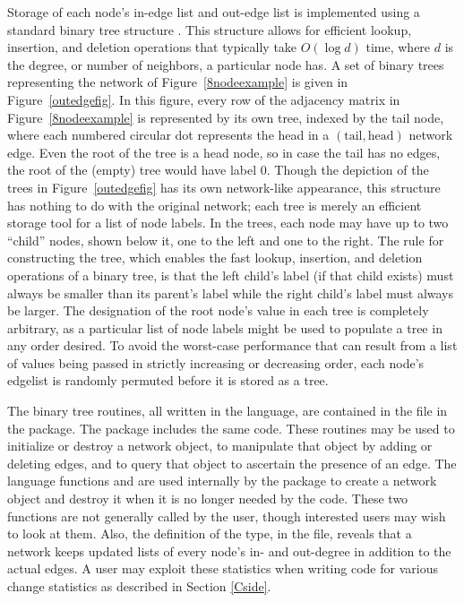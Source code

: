 \documentclass[nojss]{jss}
\begin{document}
Storage of each node's in-edge list and out-edge list is implemented using a
standard binary tree structure \citep[Chapter 13]{algorithms}. This 
structure allows for efficient lookup, insertion, and deletion operations that
typically take $O(\log d)$ time, where $d$ is the degree, or number of
neighbors, a particular node has. A set of binary trees representing the network of
Figure~\ref{8nodeexample} is given in Figure~\ref{outedgefig}. 
In this figure, every row of the adjacency matrix in Figure~\ref{8nodeexample}
is represented by its own tree, indexed by the tail node, where each numbered 
circular dot represents the head in a $(\mbox{tail}, \mbox{head})$ network edge.
Even the root of the tree is a head node, so in case the tail has no edges, the
root of the (empty) tree would have label 0.
Though the depiction of the trees in Figure~\ref{outedgefig} has its own network-like
appearance, this structure has nothing to do with the original network;
each tree is merely an efficient storage tool for a list of node labels.  In the trees,
each node may have up to two 
``child'' nodes, shown below it, one to the left and one to the right.
The rule for constructing the tree, which enables the fast lookup, insertion, and
deletion operations of a binary tree,
 is that the left child's label (if that child exists)
 must always be smaller than its parent's label while the
 right child's label must always be larger.
The designation of the root node's value in each tree is completely 
arbitrary, as a particular list of node labels might be used to populate
a tree in any order desired.
To avoid the worst-case performance that can result from a list
of values being passed in strictly increasing or decreasing order, each node's
edgelist is randomly permuted before it is stored as a tree.

The binary tree routines, all written in the  language, are contained in the
 file in the  package. The  package
includes the same code.  These routines may be used to initialize or destroy
a network object, to manipulate that object by adding or deleting edges, and to
query that object to ascertain the presence of an edge.
The  language functions  and  
are used internally by the  package to create a network object
and destroy it when it is no longer needed by the  code.  
These two functions
are not generally called by the user, though interested users may wish
to look at them.  Also, the definition of the  type, in the
 file, reveals that a network keeps updated lists of every node's
in- and out-degree in addition to the actual edges.  A user may exploit these statistics
when writing code for various change statistics as described in Section \ref{Cside}.
\end{document}
